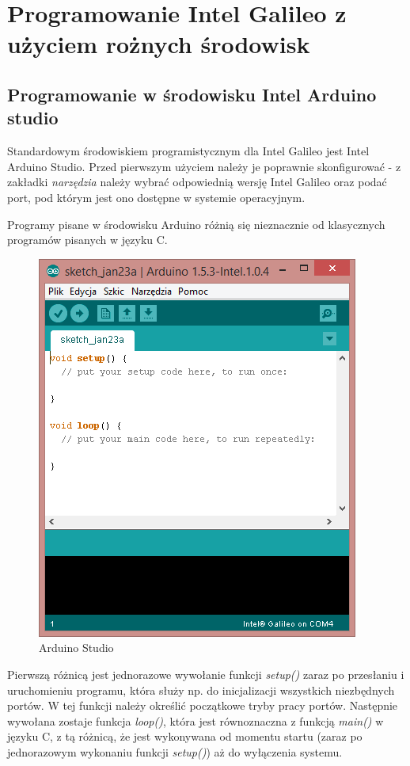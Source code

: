 \documentclass{xmgr}
\begin{document}
\chapter{Programowanie Intel Galileo z użyciem rożnych środowisk}
\section{Programowanie w środowisku Intel Arduino studio}
Standardowym środowiskiem programistycznym dla Intel Galileo jest Intel Arduino Studio. Przed pierwszym użyciem należy je poprawnie skonfigurować - z zakładki \emph{narzędzia} należy wybrać odpowiednią wersję Intel Galileo oraz podać port, pod którym jest ono dostępne w systemie operacyjnym.

Programy pisane w środowisku Arduino różnią się nieznacznie od klasycznych programów pisanych w języku C. 

\begin{figure}[!h]
    \centering
    	\includegraphics[height=0.3\textheight]{images/AS.png}
    \caption{Arduino Studio}
\end{figure}

Pierwszą różnicą jest jednorazowe wywołanie funkcji \emph{setup()} zaraz po przesłaniu i uruchomieniu programu, która służy np. do inicjalizacji wszystkich niezbędnych portów. W tej funkcji należy określić początkowe tryby pracy portów. Następnie wywołana zostaje funkcja \emph{loop()}, która jest równoznaczna z funkcją \emph{main()} w języku C, z tą różnicą, że jest wykonywana od momentu startu (zaraz po jednorazowym wykonaniu funkcji \emph{setup()}) aż do wyłączenia systemu.
\end{document}
